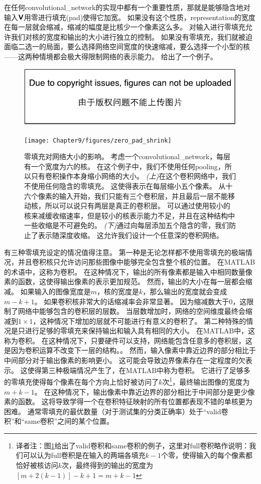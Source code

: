 在任何\gls{convolutional_network}的实现中都有一个重要性质，那就是能够隐含地对输入$\textsf{\textbf{V}}$用零进行填充(pad)使得它加宽。
如果没有这个性质，\gls{representation}的宽度在每一层就会缩减，缩减的幅度是比核少一个像素这么多。
对输入进行零填充允许我们对核的宽度和输出的大小进行独立的控制。
如果没有零填充，我们就被迫面临二选一的局面，要么选择网络空间宽度的快速缩减，要么选择一个小型的核——这两种情境都会极大得限制网络的表示能力。
给出了一个例子。
\begin{figure}[!htb]
\ifOpenSource
\centerline{\includegraphics{figure.pdf}}
\else
\centerline{\texttt{[image: Chapter9/figures/zero\_pad\_shrink]}}
\fi
\caption{零填充对网络大小的影响。
考虑一个\gls{convolutional_network}，每层有一个宽度为六的核。 
在这个例子中，我们不使用任何\gls{pooling}，所以只有卷积操作本身缩小网络的大小。
\emph{(上)}在这个卷积网络中，我们不使用任何隐含的零填充。
这使得表示在每层缩小五个像素。
从十六个像素的输入开始，我们只能有三个卷积层，并且最后一层不能移动核，所以可以说只有两层是真正的卷积层。
可以通过使用较小的核来减缓收缩速率，但是较小的核表示能力不足，并且在这种结构中一些收缩是不可避免的。
\emph{(下)}通过向每层添加五个隐含的零，我们防止了表示随深度收缩。
这允许我们设计一个任意深的卷积网络。}
\label{fig:chap9_zero_pad_shrink}
\end{figure}

有三种零填充设定的情况值得注意。
第一种是无论怎样都不使用零填充的极端情况，并且卷积核只允许访问那些图像中能够完全包含整个核的位置。
在MATLAB的术语中，这称为卷积。
在这种情况下，输出的所有像素都是输入中相同数量像素的函数，这使得输出像素的表示更加规范。
然而，输出的大小在每一层都会缩减。
如果输入的图像宽度是$m$，核的宽度是$k$，那么输出的宽度就会变成$m-k+1$。
如果卷积核非常大的话缩减率会非常显著。
因为缩减数大于0，这限制了网络中能够包含的卷积层的层数。
当层数增加时，网络的空间维度最终会缩减到$1\times 1$，这种情况下增加的层就不可能进行有意义的卷积了。
第二种特殊的情况是只进行足够的零填充来保持输出和输入具有相同的大小。
在MATLAB中，这称为卷积。
在这种情况下，只要硬件可以支持，网络能包含任意多的卷积层，这是因为卷积运算不改变下一层的结构。。
然而，输入像素中靠近边界的部分相比于中间部分对于输出像素的影响更小。
这可能会导致边界像素存在一定程度的欠表示。
这使得第三种极端情况产生了，在MATLAB中称为卷积。
它进行了足够多的零填充使得每个像素在每个方向上恰好被访问了$k$次\footnote{译者注：图\ref{fig:chap9_zero_pad_shrink}给出了\gls{valid}卷积和\gls{same}卷积的例子，这里对\gls{full}卷积略作说明：我们可以认为\gls{full}卷积是在输入的两端各填充$k-1$个零，使得输入的每个像素都恰好被核访问$k$次，最终得到的输出的宽度为$[m+2(k-1)]-k+1=m+k-1$}，最终输出图像的宽度为$m+k-1$。%
在这种情况下，输出像素中靠近边界的部分相比于中间部分是更少像素的函数。
这将导致学得一个在卷积特征映射的所有位置都表现不错的单核更为困难。
通常零填充的最优数量（对于测试集的分类正确率）处于``\gls{valid}卷积''和``\gls{same}卷积''之间的某个位置。

